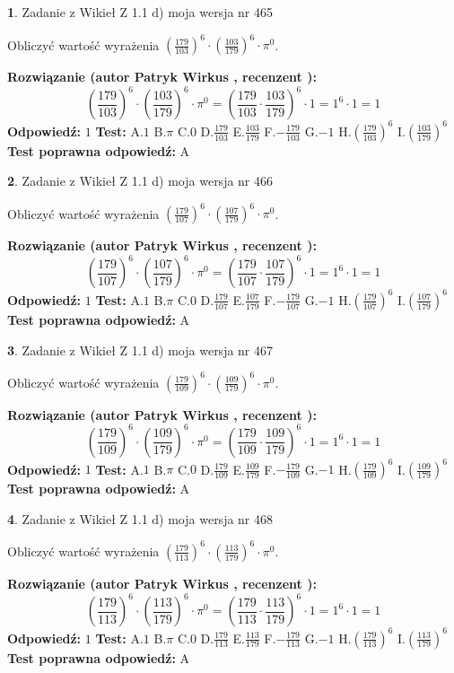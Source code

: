 \documentclass[12pt, a4paper]{article}
\theoremstyle{definition} %
\newtheorem{zad}{}
\newcommand{\zadStart}[1]{\begin{zad}#1\newline}
\newcommand{\zadStop}{\end{zad}}
\newcommand{\rozwStart}[2]{\noindent \textbf{Rozwiązanie (autor #1 , recenzent #2): }\newline}
\newcommand{\rozwStop}{\newline}
\newcommand{\odpStart}{\noindent \textbf{Odpowiedź:}\newline}
\newcommand{\odpStop}{\newline}
\newcommand{\testStart}{\noindent \textbf{Test:}\newline}
\newcommand{\testStop}{\newline}
\newcommand{\kluczStart}{\noindent \textbf{Test poprawna odpowiedź:}\newline}
\newcommand{\kluczStop}{\newline}
\begin{document}
\zadStart{Zadanie z Wikieł Z 1.1 d) moja wersja nr 465}

Obliczyć wartość wyrażenia $(\frac{179}{103})^{6} \cdot (\frac{103}{179})^{6} \cdot \pi^{0}$.
\zadStop
\rozwStart{Patryk Wirkus}{}
$$(\frac{179}{103})^{6} \cdot (\frac{103}{179})^{6} \cdot \pi^{0} = (\frac{179}{103} \cdot \frac{103}{179})^{6} \cdot 1 = 1^{6} \cdot 1 = 1$$
\rozwStop
\odpStart
$1$
\odpStop
\testStart
A.$1$ B.$\pi$ C.$0$ D.$\frac{179}{103}$ E.$\frac{103}{179}$
F.$-\frac{179}{103}$ G.$-1$
H.$(\frac{179}{103})^{6}$
I.$(\frac{103}{179})^{6}$
\testStop
\kluczStart
A
\kluczStop



\zadStart{Zadanie z Wikieł Z 1.1 d) moja wersja nr 466}

Obliczyć wartość wyrażenia $(\frac{179}{107})^{6} \cdot (\frac{107}{179})^{6} \cdot \pi^{0}$.
\zadStop
\rozwStart{Patryk Wirkus}{}
$$(\frac{179}{107})^{6} \cdot (\frac{107}{179})^{6} \cdot \pi^{0} = (\frac{179}{107} \cdot \frac{107}{179})^{6} \cdot 1 = 1^{6} \cdot 1 = 1$$
\rozwStop
\odpStart
$1$
\odpStop
\testStart
A.$1$ B.$\pi$ C.$0$ D.$\frac{179}{107}$ E.$\frac{107}{179}$
F.$-\frac{179}{107}$ G.$-1$
H.$(\frac{179}{107})^{6}$
I.$(\frac{107}{179})^{6}$
\testStop
\kluczStart
A
\kluczStop



\zadStart{Zadanie z Wikieł Z 1.1 d) moja wersja nr 467}

Obliczyć wartość wyrażenia $(\frac{179}{109})^{6} \cdot (\frac{109}{179})^{6} \cdot \pi^{0}$.
\zadStop
\rozwStart{Patryk Wirkus}{}
$$(\frac{179}{109})^{6} \cdot (\frac{109}{179})^{6} \cdot \pi^{0} = (\frac{179}{109} \cdot \frac{109}{179})^{6} \cdot 1 = 1^{6} \cdot 1 = 1$$
\rozwStop
\odpStart
$1$
\odpStop
\testStart
A.$1$ B.$\pi$ C.$0$ D.$\frac{179}{109}$ E.$\frac{109}{179}$
F.$-\frac{179}{109}$ G.$-1$
H.$(\frac{179}{109})^{6}$
I.$(\frac{109}{179})^{6}$
\testStop
\kluczStart
A
\kluczStop



\zadStart{Zadanie z Wikieł Z 1.1 d) moja wersja nr 468}

Obliczyć wartość wyrażenia $(\frac{179}{113})^{6} \cdot (\frac{113}{179})^{6} \cdot \pi^{0}$.
\zadStop
\rozwStart{Patryk Wirkus}{}
$$(\frac{179}{113})^{6} \cdot (\frac{113}{179})^{6} \cdot \pi^{0} = (\frac{179}{113} \cdot \frac{113}{179})^{6} \cdot 1 = 1^{6} \cdot 1 = 1$$
\rozwStop
\odpStart
$1$
\odpStop
\testStart
A.$1$ B.$\pi$ C.$0$ D.$\frac{179}{113}$ E.$\frac{113}{179}$
F.$-\frac{179}{113}$ G.$-1$
H.$(\frac{179}{113})^{6}$
I.$(\frac{113}{179})^{6}$
\testStop
\kluczStart
A
\kluczStop
\end{document}
